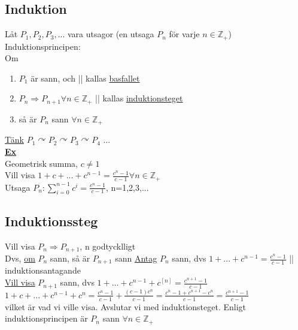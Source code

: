 \documentclass{article}
\begin{document}
        \subsection{Induktion}
            Låt $P_{1}, P_{2}, P_{3}, ...$ vara utsagor (en utsaga $P_{n}$ för varje $n\in \mathbb{Z}_{+}$)\\
            Induktionsprincipen:\\
            \indent Om
            \begin{enumerate}
                \item $P_{1}$ är sann, och || kallas \underline{basfallet}
                \item $P_{n} \Rightarrow P_{n+1} \forall n\in \mathbb{Z}_{+}$ || kallas \underline{induktionsteget}
                \item så är $P_{n}$ sann $\forall n\in \mathbb{Z}_{+}$
            \end{enumerate}
            \underline{Tänk} $P_{1} \curvearrowright P_{2} \curvearrowright P_{3} \curvearrowright P_{4}$ ...\\
            \underline{\textbf{Ex}}\\
            Geometrisk summa, $c\neq 1$\\
            Vill visa $1+c+...+c^{n-1}=\frac{c^{n}-1}{c-1} \forall n\in \mathbb{Z}_{+}$\\
            Utsaga $P_{n}:\sum_{i=0}^{n-1}c^{i}=\frac{c^{n}-1}{c-1}$, n=1,2,3,...
        \subsection{Induktionssteg}
            Vill visa $P_{n} \Rightarrow P_{n+1}$, n godtycklligt\\
            Dvs, \underline{om} $P_{n}$ sann, så är $P_{n+1}$ sann
            \underline{Antag} $P_{n}$ sann, dvs $1+...+c^{n-1}=\frac{c^{n}-1}{c-1}$ || induktionsantagande\\
            \underline{Vill visa} $P_{n+1}$ sann, dvs $1+...+c^{n-1}+c^[n]=\frac{c^{n+1}-1}{c-1}$\\
            $1+c+...+c^{n-1}+c^{n}=\frac{c^{n}-1}{c-1}+\frac{(c-1)c^{n}}{c-1}=\frac{c^{n}-1+c^{n+1}-c^{n}}{c-1}=\frac{c^{n+1}-1}{c-1}$\\
            vilket är vad vi ville visa. Avslutar vi med induktionsteget. Enligt induktionsprincipen är $P_{n}$ sann $\forall n\in \mathbb{Z}_{+}$
\end{document}
